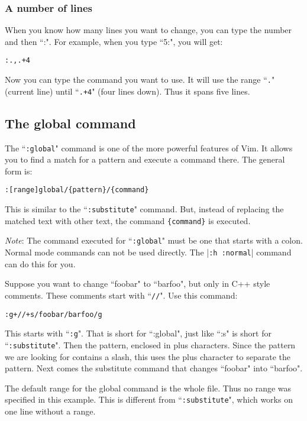 \subsubsection{A number of lines}
When you know how many lines you want to change, you can type the number and then ``:".
For example, when you type ``5:", you will get:

\begin{Verbatim}[samepage=true]
 :.,.+4
\end{Verbatim}

Now you can type the command you want to use.
It will use the range ``\texttt{.}" (current line) until ``\texttt{.+4}" (four lines down).
Thus it spans five lines.

\subsection{The global command}
The ``\texttt{:global}" command is one of the more powerful features of Vim.
It allows you to find a match for a pattern and execute a command there.
The general form is:

\begin{Verbatim}[samepage=true]
 :[range]global/{pattern}/{command}
\end{Verbatim}

This is similar to the ``\texttt{:substitute}" command.
But, instead of replacing the matched text with other text, the command \texttt{\{command\}} is executed.

\emph{Note}:
The command executed for ``\texttt{:global}" must be one that starts with a colon.
Normal mode commands can not be used directly.
The |\texttt{:h :normal}| command can do this for you.

Suppose you want to change ``foobar" to ``barfoo", but only in C++ style comments.
These comments start with ``\texttt{//}".
Use this command:

\begin{Verbatim}[samepage=true]
 :g+//+s/foobar/barfoo/g
\end{Verbatim}

This starts with ``\texttt{:g}".
That is short for ``:global", just like ``:s" is short for ``\texttt{:substitute}".
Then the pattern, enclosed in plus characters.
Since the pattern we are looking for contains a slash, this uses the plus character to separate the pattern.
Next comes the substitute command that changes ``foobar" into ``barfoo".

The default range for the global command is the whole file.
Thus no range was specified in this example.
This is different from ``\texttt{:substitute}", which works on one line without a range.

